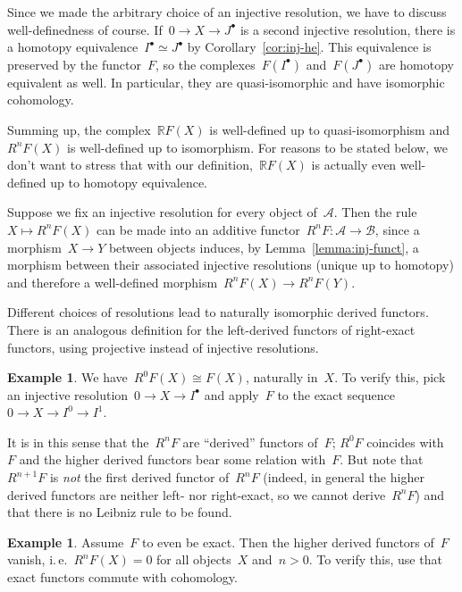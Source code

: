 \documentclass{amsart}
\makeatletter
\theoremstyle{definition}
\newtheorem{ex}[defn]{Example}
\theoremstyle{plain}
\theoremstyle{remark}
\newcommand{\A}{\mathcal{A}}
\newcommand{\B}{\mathcal{B}}
\newcommand{\RR}{\mathbb{R}}
\newcommand{\?}{\,{:}\,}
\renewcommand{\_}{\mathpunct{.}\,}
\newcommand{\ie}{i.\,e.\@\xspace}
\makeatother
\begin{document}
Since we made the arbitrary choice of an injective resolution, we have to
discuss well-definedness of course. If~$0 \to X \to J^\bullet$ is a second
injective resolution, there is a homotopy equivalence~$I^\bullet \simeq
J^\bullet$ by Corollary~\ref{cor:inj-he}. This equivalence is preserved by the
functor~$F$, so the complexes~$F(I^\bullet)$ and~$F(J^\bullet)$ are homotopy
equivalent as well. In particular, they are quasi-isomorphic and have
isomorphic cohomology.

Summing up, the complex~$\RR F(X)$ is well-defined up to quasi-isomorphism and~$R^n F(X)$
is well-defined up to isomorphism. For reasons to be stated below, we don't
want to stress that with our definition,~$\RR F(X)$ is actually even
well-defined up to homotopy equivalence.

Suppose we fix an injective resolution for every object of~$\A$. Then the rule~$X
\mapsto R^n F(X)$ can be made into an additive functor~$R^n F : \A \to \B$,
since a morphism~$X \to Y$ between objects induces, by Lemma~\ref{lemma:inj-funct}, a morphism between their
associated injective resolutions (unique up to homotopy) and
therefore a well-defined morphism~$R^n F(X) \to R^n F(Y)$.

Different choices of resolutions lead to naturally isomorphic derived
functors.
There is an analogous definition for the left-derived
functors of right-exact functors, using projective instead of injective
resolutions.

\begin{ex}We have~$R^0 F(X) \cong F(X)$, naturally in~$X$. To verify this, pick
an injective resolution~$0 \to X \to I^\bullet$ and apply~$F$ to
the exact sequence~$0 \to X \to I^0 \to I^1$.
\end{ex}

It is in this sense that the~$R^n F$ are ``derived'' functors of~$F$; $R^0 F$
coincides with~$F$ and the higher derived functors bear some relation with~$F$.
But note that~$R^{n+1} F$ is \emph{not} the first derived functor of~$R^n F$
(indeed, in general the higher derived functors are neither left- nor
right-exact, so we cannot derive~$R^n F$) and that there is no Leibniz rule to
be found.

\begin{ex}Assume~$F$ to even be exact. Then the higher derived functors of~$F$
vanish, \ie~$R^n F(X) = 0$ for all objects~$X$ and~$n > 0$. To verify this, use
that exact functors commute with cohomology.\end{ex}
\end{document}
